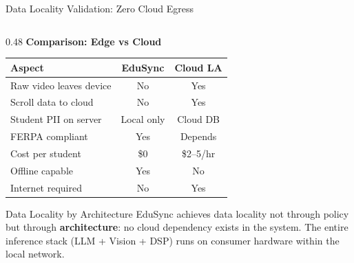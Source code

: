 \documentclass[aspectratio=169,10pt]{beamer}
\begin{document}
\begin{frame}{Data Locality Validation: Zero Cloud Egress}
\begin{columns}[T]
\begin{column}{0.48\textwidth}
\textbf{Comparison: Edge vs Cloud}

\vspace{4pt}
\footnotesize
\begin{tabular}{@{}p{2.5cm}cc@{}}
\toprule
\textbf{Aspect} & \textbf{EduSync} & \textbf{Cloud LA} \\
\midrule
Raw video leaves device & No & Yes \\
Scroll data to cloud & No & Yes \\
Student PII on server & Local only & Cloud DB \\
FERPA compliant & Yes & Depends \\
Cost per student & \$0 & \$2--5/hr \\
Offline capable & Yes & No \\
Internet required & No & Yes \\
\bottomrule
\end{tabular}

\vspace{8pt}
\begin{exampleblock}{\scriptsize Data Locality by Architecture}
\scriptsize EduSync achieves data locality not through policy but through \textbf{architecture}: no cloud dependency exists in the system. The entire inference stack (LLM + Vision + DSP) runs on consumer hardware within the local network.
\end{exampleblock}
\end{column}
\end{columns}
\end{frame}
\end{document}
